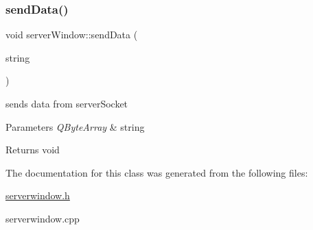 \subsubsection{\texorpdfstring{send\+Data()}{sendData()}}
{\footnotesize\ttfamily void server\+Window\+::send\+Data (\begin{DoxyParamCaption}\item[{Q\+Byte\+Array}]{string }\end{DoxyParamCaption})}



sends data from server\+Socket 


\begin{DoxyParams}{Parameters}
{\em Q\+Byte\+Array} & string \\
\hline
\end{DoxyParams}
\begin{DoxyReturn}{Returns}
void 
\end{DoxyReturn}


The documentation for this class was generated from the following files\+:\begin{DoxyCompactItemize}
\item 
\mbox{\hyperlink{serverwindow_8h}{serverwindow.\+h}}\item 
serverwindow.\+cpp\end{DoxyCompactItemize}
